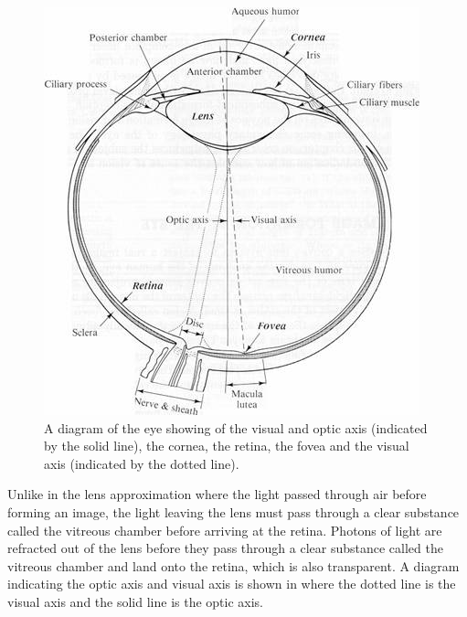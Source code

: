 \begin{figure}[H]
\centering
  \includegraphics{figures/eye_diagram}
\caption{A diagram of the eye showing of the visual
 	     and optic axis (indicated by the solid line), the cornea, the retina, the fovea
              and the visual axis (indicated by the dotted line).}
\label{fig:optic_axis}
\end{figure}

Unlike in the lens approximation where the light passed through air before forming an
image, the light leaving the lens must pass through a clear substance called the
vitreous chamber before arriving at the retina. Photons of light are refracted out of the
lens before they pass through a clear substance called the vitreous chamber and land
onto the retina, which is also transparent. A diagram indicating the optic axis and
visual axis is shown in  where the dotted line is the visual axis and
the solid line is the optic axis.

